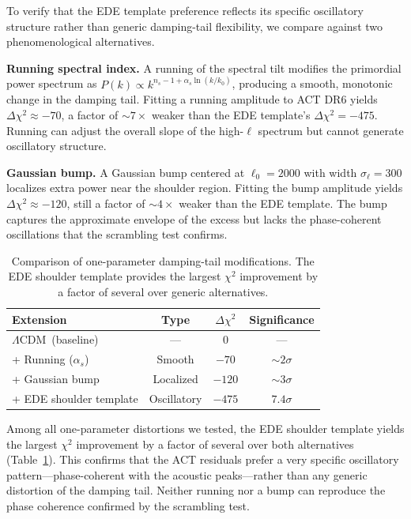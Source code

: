 \documentclass[onecolumn,showpacs,preprintnumbers,amsmath,amssymb,prd]{revtex4-2}
\newcommand{\lcdm}{$\Lambda$CDM}
\begin{document}
To verify that the EDE template preference reflects its specific oscillatory 
structure rather than generic damping-tail flexibility, we compare against 
two phenomenological alternatives.

\textbf{Running spectral index.} A running of the spectral tilt modifies 
the primordial power spectrum as $P(k) \propto k^{n_s - 1 + \alpha_s \ln(k/k_0)}$, 
producing a smooth, monotonic change in the damping tail. Fitting a running 
amplitude to ACT DR6 yields $\Delta\chi^2 \approx -70$, a factor of 
$\sim 7\times$ weaker than the EDE template's $\Delta\chi^2 = -475$. Running 
can adjust the overall slope of the high-$\ell$ spectrum but cannot generate 
oscillatory structure.

\textbf{Gaussian bump.} A Gaussian bump centered at $\ell_0 = 2000$ with 
width $\sigma_\ell = 300$ localizes extra power near the shoulder region. 
Fitting the bump amplitude yields $\Delta\chi^2 \approx -120$, still a factor 
of $\sim 4\times$ weaker than the EDE template. The bump captures the 
approximate envelope of the excess but lacks the phase-coherent oscillations 
that the scrambling test confirms.

\begin{table}[h]
\centering
\caption{Comparison of one-parameter damping-tail modifications. The EDE 
shoulder template provides the largest $\chi^2$ improvement by a factor of 
several over generic alternatives.}
\begin{tabular}{lccc}
\toprule
Extension & Type & $\Delta\chi^2$ & Significance \\
\midrule
\lcdm\ (baseline) & --- & 0 & --- \\
+ Running ($\alpha_s$) & Smooth & $-70$ & $\sim 2\sigma$ \\
+ Gaussian bump & Localized & $-120$ & $\sim 3\sigma$ \\
+ EDE shoulder template & Oscillatory & $-475$ & $7.4\sigma$ \\
\bottomrule
\end{tabular}
\label{tab:alternatives}
\end{table}

Among all one-parameter distortions we tested, the EDE shoulder template 
yields the largest $\chi^2$ improvement by a factor of several over both 
alternatives (Table~\ref{tab:alternatives}). This confirms that the ACT 
residuals prefer a very specific oscillatory pattern---phase-coherent with 
the acoustic peaks---rather than any generic distortion of the damping tail. 
Neither running nor a bump can reproduce the phase coherence 
confirmed by the scrambling test.
\end{document}

